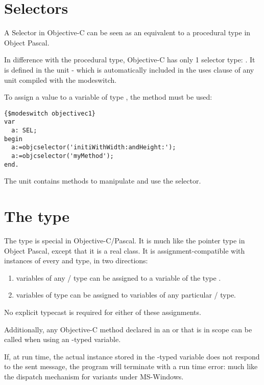 \section{Selectors}
A Selector in Objective-C can be seen as an equivalent to a procedural type
in Object Pascal.

In difference with the procedural type, Objective-C has only 1 selector type:
. It is defined in the  unit - which is automatically
included in the uses clause of any unit compiled with the 
modeswitch.

To assign a value to a variable of type , the 
method must be used: 
\begin{verbatim}
{$modeswitch objectivec1}
var
  a: SEL;
begin
  a:=objcselector('initiWithWidth:andHeight:');
  a:=objcselector('myMethod');
end.
\end{verbatim}
The  unit contains methods to manipulate and use the selector.

\section{The  type}
The  type is special in Objective-C/Pascal. It is much like the pointer
type in Object Pascal, except that it is a real class. It is assignment-compatible
with instances of every  and  type, in two
directions:
\begin{enumerate}
\item variables of any / type can be
assigned to a variable of the type .
\item variables of type  can be assigned to variables of any particular 
/ type. 
\end{enumerate}
No explicit typecast is required for either of these assignments.

Additionally, any Objective-C method declared in an  or
 that is in scope can be called when using an 
-typed variable. 

If, at run time, the actual  instance stored in the 
-typed variable does not respond to the sent message, the 
program will terminate with a run time error: much like the dispatch
mechanism for variants under MS-Windows.

